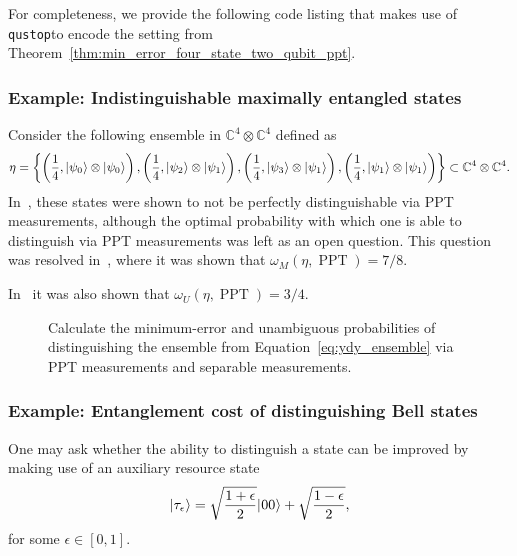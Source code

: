 \documentclass[11pt]{article}
\theoremstyle{definition}
\newcommand{\microspace}{\mspace{0.5mu}}
\newcommand{\PPT}{\operatorname{PPT}}
\newcommand{\ket}[1]{
  \lvert\microspace #1 \microspace \rangle}
\newcommand{\complex}{\mathbb{C}}
\newcommand{\qustop}{\texttt{qustop}}
\begin{document}
For completeness, we provide the following code listing that makes use of
\qustop to encode the setting from
Theorem~\ref{thm:min_error_four_state_two_qubit_ppt}.

\begin{figure}[!htpb]
    \centering
    
    \caption{}
    \label{fig:ppt_four_state_two_qubit}
\end{figure}


\subsubsection*{Example: Indistinguishable maximally entangled states}

Consider the following ensemble in $\complex^4 \otimes \complex^4$ defined as
\begin{equation}\label{eq:ydy_ensemble}
    \eta = \left\{ \left(\frac{1}{4}, \ket{\psi_0} \otimes \ket{\psi_0} \right), 
                  \left(\frac{1}{4}, \ket{\psi_2} \otimes \ket{\psi_1} \right),
                  \left(\frac{1}{4}, \ket{\psi_3} \otimes \ket{\psi_1} \right),
                  \left(\frac{1}{4}, \ket{\psi_1} \otimes \ket{\psi_1} \right) 
            \right\} \subset \complex^4 \otimes \complex^4.
\end{equation}
In~\cite{yu2012four}, these states were shown to not be perfectly
distinguishable via PPT measurements, although the optimal probability with
which one is able to distinguish via PPT measurements was left as an open
question. This question was resolved in~\cite{cosentino2013positive}, where it
was shown that $\omega_M(\eta, \PPT) = 7/8$.

In~\cite{cosentino2013positive} it was also shown that $\omega_U(\eta, \PPT) = 3/4$.

\begin{figure}[!htpb]
    \centering
    
    \caption{Calculate the minimum-error and unambiguous probabilities of
    distinguishing the ensemble from Equation~\eqref{eq:ydy_ensemble} via PPT
    measurements and separable measurements.}
    \label{fig:ppt_ydy}
\end{figure}


\subsubsection*{Example: Entanglement cost of distinguishing Bell states}

One may ask whether the ability to distinguish a state can be improved by
making use of an auxiliary resource state
\begin{equation}
    \ket{\tau_{\epsilon}} = \sqrt{\frac{1+\epsilon}{2}}\ket{00} + \sqrt{\frac{1-\epsilon}{2}},
\end{equation}
for some $\epsilon \in [0, 1]$.




\end{document}
